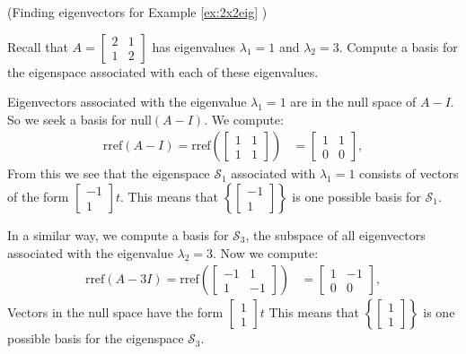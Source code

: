 \documentclass{ximera}
\begin{document}
\begin{example}\label{ex:eigvect2x2eig} (Finding eigenvectors for Example \ref{ex:2x2eig} ) 

Recall that $A=\begin{bmatrix} 2& 1\\ 1&2
\end{bmatrix}$ has eigenvalues $\lambda_1=1$ and $\lambda_2=3$.  Compute a basis for the eigenspace associated with each of these eigenvalues.
\begin{explanation}
Eigenvectors associated with the eigenvalue $\lambda_1=1$ are in the null space of $A-I$.  So we seek a basis for $\mbox{null}(A-I)$.  We compute:
\begin{align*}\mbox{rref}(A-I)=\mbox{rref}\left(\begin{bmatrix}1&1\\1&1\end{bmatrix}\right)&=\begin{bmatrix}1&1\\0&0\end{bmatrix},
\end{align*}
From this we see that the eigenspace $\mathcal{S}_1$ associated with $\lambda_1=1$ consists of vectors of the form $\begin{bmatrix}-1\\1\end{bmatrix}t$.
This means that $\left\{\begin{bmatrix}-1\\1\end{bmatrix}\right\}$ is one possible basis for $\mathcal{S}_1$.

In a similar way, we compute a basis for $\mathcal{S}_3$, the subspace of all eigenvectors associated with the eigenvalue $\lambda_2=3$.  Now we compute:
\begin{align*}\mbox{rref}(A-3I)=\mbox{rref}\left(\begin{bmatrix}-1&1\\1&-1\end{bmatrix}\right)&=\begin{bmatrix}1&-1\\0&0\end{bmatrix},
\end{align*}
Vectors in the null space have the form $\begin{bmatrix}1\\1\end{bmatrix}t$ This means that $\left\{\begin{bmatrix}1\\1\end{bmatrix}\right\}$ is one possible basis for the eigenspace $\mathcal{S}_3$.


\end{explanation}
\end{example}
\end{document}
